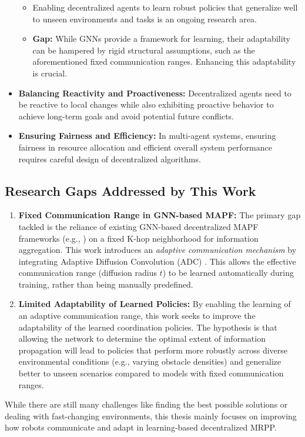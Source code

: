 \begin{itemize}
        \begin{itemize}
            \item Enabling decentralized agents to learn robust policies that generalize well to unseen environments and tasks is an ongoing research area.
            \item \textbf{Gap:} While GNNs provide a framework for learning, their adaptability can be hampered by rigid structural assumptions, such as the aforementioned fixed communication ranges. Enhancing this adaptability is crucial.
        \end{itemize}
    \item \textbf{Balancing Reactivity and Proactiveness:} Decentralized agents need to be reactive to local changes while also exhibiting proactive behavior to achieve long-term goals and avoid potential future conflicts.
    \item \textbf{Ensuring Fairness and Efficiency:} In multi-agent systems, ensuring fairness in resource allocation and efficient overall system performance requires careful design of decentralized algorithms.
\end{itemize}

\subsection{Research Gaps Addressed by This Work}
\begin{enumerate}
    \item \textbf{Fixed Communication Range in GNN-based MAPF:} The primary gap tackled is the reliance of existing GNN-based decentralized MAPF frameworks (e.g., \cite{Li2021GNNCoordination}) on a fixed K-hop neighborhood for information aggregation. This work introduces an \textit{adaptive communication mechanism} by integrating Adaptive Diffusion Convolution (ADC) \cite{Zhao2021ADC}. This allows the effective communication range (diffusion radius $t$) to be learned automatically during training, rather than being manually predefined.
    \item \textbf{Limited Adaptability of Learned Policies:} By enabling the learning of an adaptive communication range, this work seeks to improve the adaptability of the learned coordination policies. The hypothesis is that allowing the network to determine the optimal extent of information propagation will lead to policies that perform more robustly across diverse environmental conditions (e.g., varying obstacle densities) and generalize better to unseen scenarios compared to models with fixed communication ranges.
\end{enumerate}
While there are still many challenges like finding the best possible solutions or dealing with fast-changing environments, this thesis mainly focuses on improving how robots communicate and adapt in learning-based decentralized MRPP.

